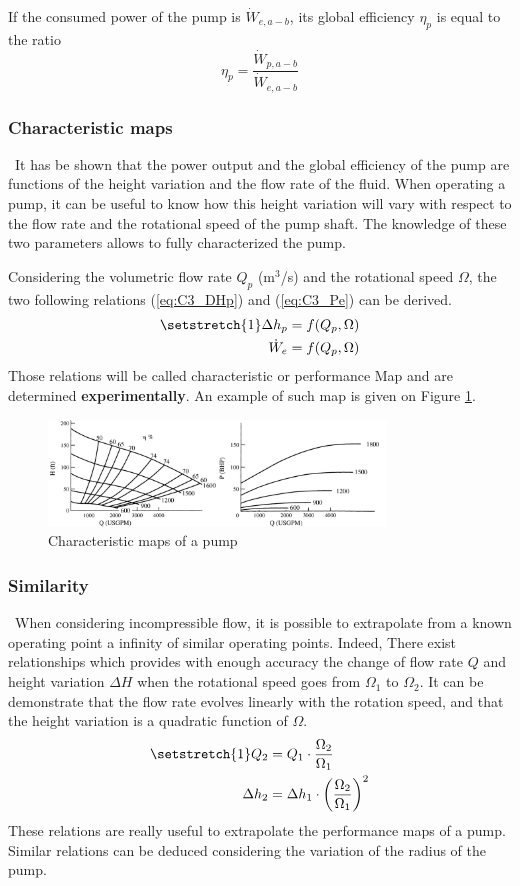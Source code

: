 If the consumed power of the pump is $\dot{W}_{e,a-b}$, its global efficiency $\eta_p$ is equal to the ratio
\begin{equation}
\eta_p = \frac{\dot{W}_{p,a-b}}{\dot{W}_{e,a-b}}\label{eq:C3_Etapump}
\end{equation}
\subsubsection{Characteristic maps}
\quad\, It has be shown that the power output and the global efficiency of the pump are functions of the height variation and the flow rate of the fluid. When operating a pump, it can be useful to know how this height variation will vary with respect to the flow rate and the rotational speed of the pump shaft. The knowledge of these two parameters allows to fully characterized the pump.

Considering the volumetric flow rate $Q_p$ (m$^3$/s) and the rotational speed $\Omega$, the two following relations (\ref{eq:C3_DHp}) and (\ref{eq:C3_Pe}) can be derived.
\begin{align}
\setstretch{1}
\Delta h_p &= f(Q_p, \Omega)\label{eq:C3_DHp}\\
\dot{W}_e &= f(Q_p, \Omega)\label{eq:C3_Pe}
\end{align}
Those relations will be called characteristic or performance Map and are determined \textbf{experimentally}. An example of such map is given on Figure \ref{fig:C3_MapPump}.
\begin{figure}[h]
\centering
\includegraphics[width=0.8\textwidth]{char_map_pump.png}
\caption{Characteristic maps of a pump \citep{Hillewaert2019}}
\label{fig:C3_MapPump}
\end{figure}
\subsubsection{Similarity}
\quad\, When considering incompressible flow, it is possible to extrapolate from a known operating point a infinity of similar operating points. Indeed, There exist relationships which provides with enough accuracy the change of flow rate $Q$ and height variation $\Delta H$ when the rotational speed goes from $\Omega_1$ to $\Omega_2$. It can be demonstrate that the flow rate evolves linearly with the rotation speed, and that the height variation is a quadratic function of $\Omega$.
\begin{align}
\setstretch{1}
Q_2 &= Q_1\cdot\frac{\Omega_2}{\Omega_1} \label{eq:C3_Qsim}\\
\Delta h_2 &= \Delta h_1\cdot\left(\frac{\Omega_2}{\Omega_1}\right)^2 \label{eq:C3_DHsim}
\end{align} 
These relations are really useful to extrapolate the performance maps of a pump. Similar relations can be deduced considering the variation of the radius of the pump.

